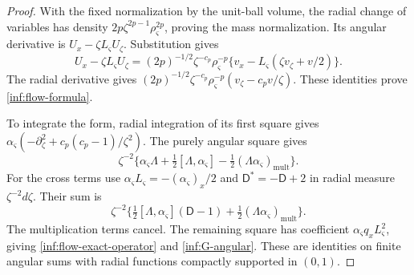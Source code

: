 \begin{proof}
With the fixed normalization by the unit-ball volume, the radial
change of variables has density $2p\zeta^{2p-1}\rho_\varsigma^{2p}$,
proving the mass normalization.
Its angular derivative is $U_x-\zeta L_{\varsigma}U_\zeta$.
Substitution gives
\[
 U_x-\zeta L_{\varsigma}U_\zeta
 = (2p)^{-1/2}\zeta^{-c_p}\rho_\varsigma^{-p}
       \{v_x-L_\varsigma(\zeta v_\zeta+v/2)\}.
\]
The radial derivative gives
$(2p)^{-1/2}\zeta^{-c_p}\rho_\varsigma^{-p}(v_\zeta-c_pv/\zeta)$.
These identities prove \eqref{inf:flow-formula}.

To integrate the form, radial integration of its first square gives
$\alpha_\varsigma(-\partial_\zeta^2+c_p(c_p-1)/\zeta^2)$.
The purely angular square gives
\[
 \zeta^{-2}\{\alpha_\varsigma\Lambda+\tfrac12[\Lambda,\alpha_\varsigma]
                         -\tfrac12(\Lambda\alpha_\varsigma)_{\mathrm{mult}}\}.
\]
For the cross terms use $\alpha_{\varsigma}L_\varsigma=-(\alpha_\varsigma)_x/2$ and
$\mathsf D^*=-\mathsf D+2$ in radial measure $\zeta^{-2}d\zeta$.
Their sum is
\[
 \zeta^{-2}\{\tfrac12[\Lambda,\alpha_\varsigma](\mathsf D-1)
                         +\tfrac12(\Lambda\alpha_\varsigma)_{\mathrm{mult}}\}.
\]
The multiplication terms cancel. The remaining square has
coefficient $\alpha_{\varsigma}q_xL_\varsigma^2$, giving
\eqref{inf:flow-exact-operator} and \eqref{inf:G-angular}.
These are identities on finite angular sums with radial functions
compactly supported in $(0,1)$.


\end{proof}
